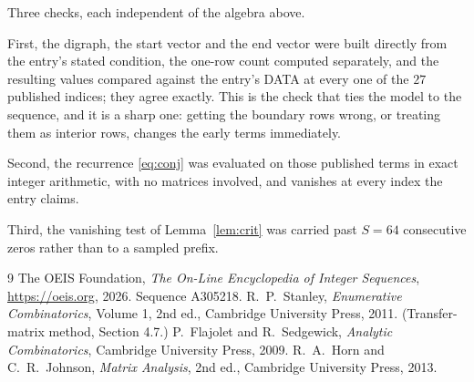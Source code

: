 \documentclass[11pt,a4paper]{article}
\theoremstyle{plain}
\theoremstyle{definition}
\begin{document}
Three checks, each independent of the algebra above.

First, the digraph, the start vector and the end vector were built directly from the
entry's stated condition, the one-row count computed separately, and the resulting values
compared against the entry's DATA at every one of the $27$ published indices; they
agree exactly. This is the check that ties the model to the sequence, and it is a sharp one:
getting the boundary rows wrong, or treating them as interior rows, changes the early terms
immediately.

Second, the recurrence \eqref{eq:conj} was evaluated on those published terms in exact
integer arithmetic, with no matrices involved, and vanishes at every index the entry claims.

Third, the vanishing test of Lemma~\ref{lem:crit} was carried past $S=64$ consecutive
zeros rather than to a sampled prefix.

\begin{thebibliography}{9}
 The OEIS Foundation, \emph{The On-Line Encyclopedia of Integer
Sequences}, \url{https://oeis.org}, 2026. Sequence A305218.
 R.~P.~Stanley, \emph{Enumerative Combinatorics}, Volume 1, 2nd ed.,
Cambridge University Press, 2011. (Transfer-matrix method, Section 4.7.)
 P.~Flajolet and R.~Sedgewick, \emph{Analytic Combinatorics}, Cambridge
University Press, 2009.
 R.~A.~Horn and C.~R.~Johnson, \emph{Matrix Analysis}, 2nd ed., Cambridge
University Press, 2013.
\end{thebibliography}
\end{document}
